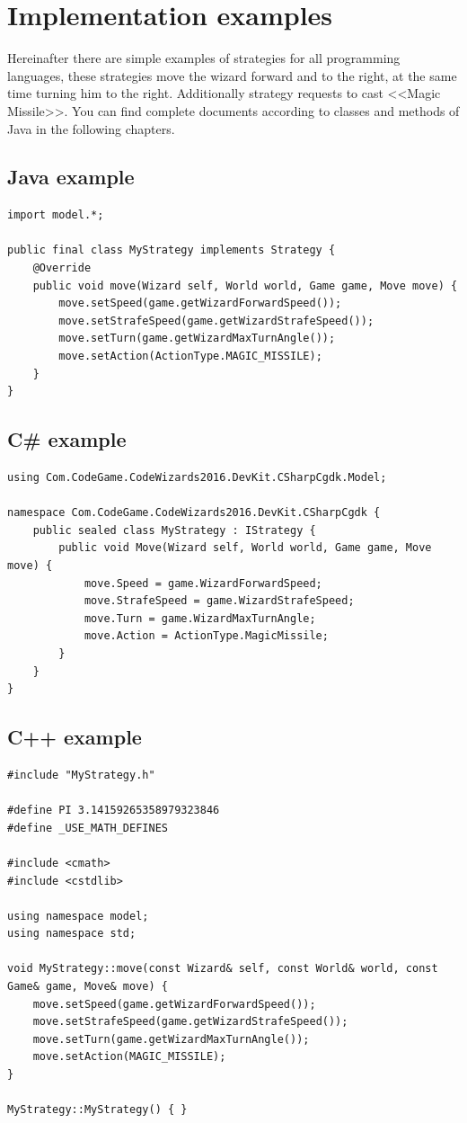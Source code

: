 \newpage
\section{Implementation examples}
 
Hereinafter there are simple examples of strategies for all programming languages, these strategies move the wizard forward and to the right, at the same time
turning him to the right. Additionally strategy requests to cast <<Magic Missile>>. You can find complete documents
according to classes and methods of Java in the following chapters.

\subsection{Java example}

\begin{verbatim}
import model.*;

public final class MyStrategy implements Strategy {
    @Override
    public void move(Wizard self, World world, Game game, Move move) {
        move.setSpeed(game.getWizardForwardSpeed());
        move.setStrafeSpeed(game.getWizardStrafeSpeed());
        move.setTurn(game.getWizardMaxTurnAngle());
        move.setAction(ActionType.MAGIC_MISSILE);
    }
}
\end{verbatim}

\subsection{C\# example}

\begin{verbatim}
using Com.CodeGame.CodeWizards2016.DevKit.CSharpCgdk.Model;

namespace Com.CodeGame.CodeWizards2016.DevKit.CSharpCgdk {
    public sealed class MyStrategy : IStrategy {
        public void Move(Wizard self, World world, Game game, Move move) {
            move.Speed = game.WizardForwardSpeed;
            move.StrafeSpeed = game.WizardStrafeSpeed;
            move.Turn = game.WizardMaxTurnAngle;
            move.Action = ActionType.MagicMissile;
        }
    }
}
\end{verbatim}

\newpage
\subsection{C++ example}

\begin{verbatim}
#include "MyStrategy.h"

#define PI 3.14159265358979323846
#define _USE_MATH_DEFINES

#include <cmath>
#include <cstdlib>

using namespace model;
using namespace std;

void MyStrategy::move(const Wizard& self, const World& world, const Game& game, Move& move) {
    move.setSpeed(game.getWizardForwardSpeed());
    move.setStrafeSpeed(game.getWizardStrafeSpeed());
    move.setTurn(game.getWizardMaxTurnAngle());
    move.setAction(MAGIC_MISSILE);
}

MyStrategy::MyStrategy() { }
\end{verbatim}

